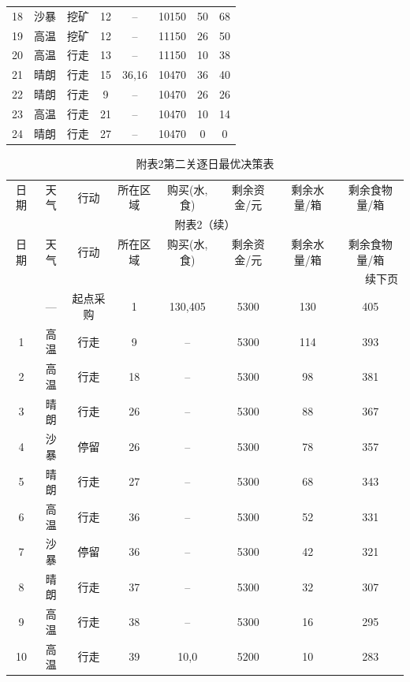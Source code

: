 \documentclass{cumcmthesis}
\numberwithin{equation}{section}
\numberwithin{figure}{section}
\numberwithin{table}{section}
\begin{document}
\begin{appendices}
{\begin{longtable}{cccccccc}
    18 & 沙暴 & 挖矿 & 12 & -- & 10150 & 50 & 68 \\
    19 & 高温 & 挖矿 & 12 & -- & 11150 & 26 & 50 \\
    20 & 高温 & 行走 & 13 & -- & 11150 & 10 & 38 \\
    21 & 晴朗 & 行走 & 15 & 36,16 & 10470 & 36 & 40 \\
    22 & 晴朗 & 行走 & 9 & -- & 10470 & 26 & 26 \\
    23 & 高温 & 行走 & 21 & -- & 10470 & 10 & 14 \\
    24 & 晴朗 & 行走 & 27 & -- & 10470 & 0 & 0 \\
   
\end{longtable}
}

{
\begin{longtable}{cccccccc}
\captionsetup{justification=raggedright,singlelinecheck=off}
    \caption*{附表2\quad 第二关逐日最优决策表}
      \label{tab:q1_daily2} \\
    \toprule
    日期 & 天气 & 行动 & 所在区域 & 购买(水,食) & 剩余资金/元 & 剩余水量/箱 & 剩余食物量/箱 \\
    \midrule
    \endfirsthead
    \multicolumn{8}{c}{附表2（续）} \\
    \toprule
    日期 & 天气 & 行动 & 所在区域 & 购买(水,食) & 剩余资金/元 & 剩余水量/箱 & 剩余食物量/箱 \\
    \midrule
    \endhead
    \midrule
    \multicolumn{8}{r}{续下页} \\
    \endfoot
    \bottomrule
    \endlastfoot
    0 & — & 起点采购 & 1 & 130,405 & 5300 & 130 & 405 \\
    1 & 高温 & 行走 & 9 & -- & 5300 & 114 & 393 \\
    2 & 高温 & 行走 & 18 & -- & 5300 & 98 & 381 \\
    3 & 晴朗 & 行走 & 26 & -- & 5300 & 88 & 367 \\
    4 & 沙暴 & 停留 & 26 & -- & 5300 & 78 & 357 \\
    5 & 晴朗 & 行走 & 27 & -- & 5300 & 68 & 343 \\
    6 & 高温 & 行走 & 36 & -- & 5300 & 52 & 331 \\
    7 & 沙暴 & 停留 & 36 & -- & 5300 & 42 & 321 \\
    8 & 晴朗 & 行走 & 37 & -- & 5300 & 32 & 307 \\
    9 & 高温 & 行走 & 38 & -- & 5300 & 16 & 295 \\
    10 & 高温 & 行走 & 39 & 10,0 & 5200 & 10 & 283 \\

\end{longtable}}
\end{appendices}
\end{document}
